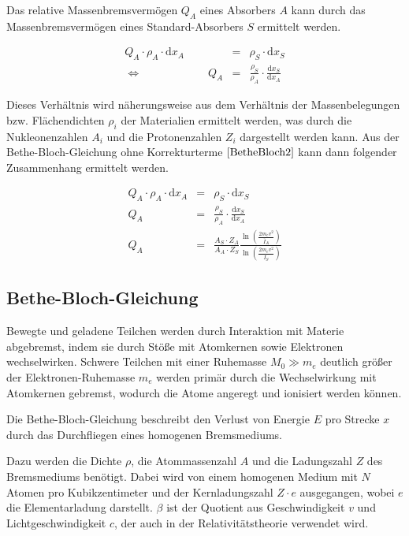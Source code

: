 \documentclass[12pt,a4paper]{scrartcl}
\numberwithin{equation}{section} %
\begin{document}
Das relative Massenbremsvermögen $Q_A$ eines Absorbers $A$ kann durch das Massenbremsvermögen eines Standard-Absorbers $S$ ermittelt werden.

\begin{eqnarray}
	Q_A \cdot \rho_A \cdot \mathrm dx_A
	&=& \rho_S \cdot \mathrm dx_S \\
	\Leftrightarrow \qquad\qquad\qquad Q_A
	&=& \frac{\rho_S}{\rho_A}
	\cdot \frac{\mathrm dx_S}{\mathrm dx_A}
\end{eqnarray}

Dieses Verhältnis wird näherungsweise aus dem Verhältnis der Massenbelegungen bzw. Flächendichten $\rho_i$ der Materialien ermittelt werden, was durch die Nukleonenzahlen $A_i$ und die Protonenzahlen $Z_i$ dargestellt werden kann. Aus der Bethe-Bloch-Gleichung ohne Korrekturterme $\eqref{BetheBloch2}$ kann dann folgender Zusammenhang ermittelt werden.

\begin{eqnarray}
	Q_A \cdot \rho_A \cdot \mathrm dx_A
	&=& \rho_S \cdot \mathrm dx_S \\
	Q_A &=& \frac{\rho_S}{\rho_A} \cdot \frac{\mathrm dx_S}{\mathrm dx_A} \\
	Q_A &=& \frac{A_S\cdot Z_A}{A_A\cdot Z_S}
	\frac{\ln\left(\frac{2m_ev^2}{\bar I_A}\right)}{\ln\left(\frac{2m_ev^2}{\bar I_S}\right)}
\end{eqnarray}

\hypertarget{bethe-bloch-gleichung}{%
\subsection{Bethe-Bloch-Gleichung}\label{bethe-bloch-gleichung}}

Bewegte und geladene Teilchen werden durch Interaktion mit Materie abgebremst, indem sie durch Stöße mit Atomkernen sowie Elektronen wechselwirken. Schwere Teilchen mit einer Ruhemasse $M_0\gg m_e$ deutlich größer der Elektronen-Ruhemasse $m_e$ werden primär durch die Wechselwirkung mit Atomkernen gebremst, wodurch die Atome angeregt und ionisiert werden können.

Die Bethe-Bloch-Gleichung beschreibt den Verlust von Energie $E$ pro Strecke $x$ durch das Durchfliegen eines homogenen Bremsmediums.

Dazu werden die Dichte $\rho$, die Atommassenzahl $A$ und die Ladungszahl $Z$ des Bremsmediums benötigt. Dabei wird von einem homogenen Medium mit $N$ Atomen pro Kubikzentimeter und der Kernladungszahl $Z\cdot e$ ausgegangen, wobei $e$ die Elementarladung darstellt. $\beta$ ist der Quotient aus Geschwindigkeit $v$ und Lichtgeschwindigkeit $c$, der auch in der Relativitätstheorie verwendet wird.
\end{document}
